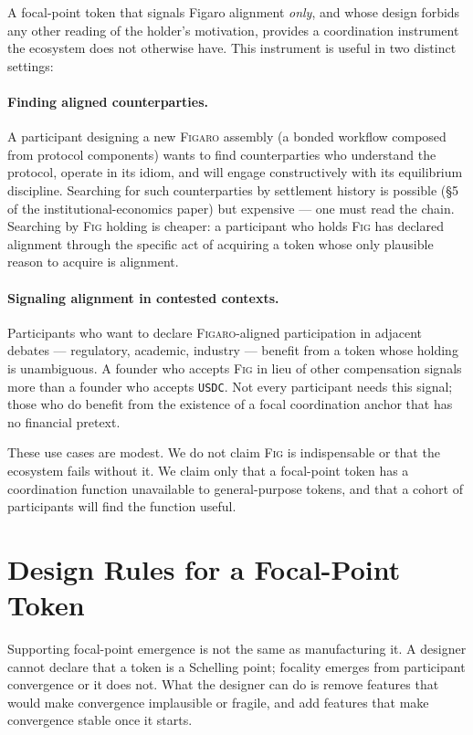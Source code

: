 \documentclass[11pt,a4paper]{article}
\theoremstyle{definition}
\theoremstyle{remark}
\newcommand{\figaro}{\textsc{Figaro}}
\newcommand{\fig}{\textsc{Fig}}
\begin{document}
A focal-point token that signals Figaro alignment \emph{only},
and whose design forbids any other reading of the holder's
motivation, provides a coordination instrument the ecosystem does
not otherwise have. This instrument is useful in two distinct
settings:

\paragraph{Finding aligned counterparties.}
A participant designing a new \figaro{} assembly (a bonded
workflow composed from protocol components) wants to find
counterparties who understand the protocol, operate in its idiom,
and will engage constructively with its equilibrium discipline.
Searching for such counterparties by settlement history is
possible (§5 of the institutional-economics paper) but expensive --- one must
read the chain. Searching by \fig{} holding is cheaper: a
participant who holds \fig{} has declared alignment through the
specific act of acquiring a token whose only plausible reason to
acquire is alignment.

\paragraph{Signaling alignment in contested contexts.}
Participants who want to declare \figaro{}-aligned participation
in adjacent debates --- regulatory, academic, industry --- benefit
from a token whose holding is unambiguous. A founder who accepts
\fig{} in lieu of other compensation signals more than a founder
who accepts \texttt{USDC}. Not every participant needs this
signal; those who do benefit from the existence of a focal
coordination anchor that has no financial pretext.

These use cases are modest. We do not claim \fig{} is
indispensable or that the ecosystem fails without it. We claim
only that a focal-point token has a coordination function
unavailable to general-purpose tokens, and that a cohort of
participants will find the function useful.

\section{Design Rules for a Focal-Point Token}
\label{sec:design-rules}

Supporting focal-point emergence is not the same as manufacturing
it. A designer cannot declare that a token is a Schelling point;
focality emerges from participant convergence or it does not.
What the designer can do is remove features that would make
convergence implausible or fragile, and add features that make
convergence stable once it starts.
\end{document}
